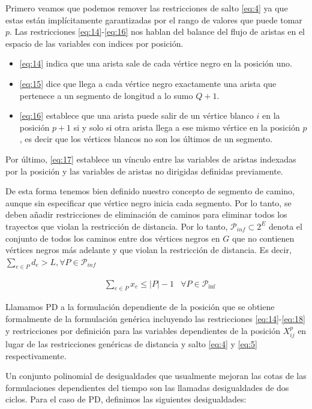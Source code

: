\documentclass[10pt, a4paper]{article}
\theoremstyle{definition}
\begin{document}
Primero veamos que podemos remover las restricciones de salto \ref{eq:4} ya que estas están implícitamente garantizadas por el rango de valores que puede tomar $p$.
Las restricciones \ref{eq:14}-\ref{eq:16} nos hablan del balance del flujo de aristas en el espacio de las variables con indices por posición.
\begin{itemize}
  \item \ref{eq:14} indica que una arista sale de cada vértice negro en la posición uno.
  \item \ref{eq:15} dice que llega a cada vértice negro exactamente una arista que pertenece a un segmento de longitud a lo sumo $Q+1$.
  \item \ref{eq:16} establece que una arista puede salir de un vértice blanco $i$ en la posición $p+1$ si y solo si otra arista llega a ese mismo vértice en la posición $p$, es decir que los vértices blancos no son los últimos de un segmento.
\end{itemize}
Por último, \ref{eq:17} establece un vínculo entre las variables de aristas indexadas por la posición y las variables de aristas no dirigidas definidas previamente.

De esta forma tenemos bien definido nuestro concepto de segmento de camino, aunque sin especificar que vértice negro inicia cada segmento. Por lo tanto, se deben añadir restricciones de eliminación de caminos para eliminar todos los trayectos que violan la restricción de distancia.
Por lo tanto, $\mathcal{P}_{inf} \subset 2^E$ denota el conjunto de todos los caminos entre dos vértices negros en $G$ que no contienen vértices negros más adelante y que violan la restricción de distancia.
Es decir, $\sum_{e \in P} d_e > L, \forall P \in \mathcal{P}_{inf}$


\begin{align}
	& \sum_{e \in P} x_{e} \leq|P|-1 & \forall P \in \mathcal{P}_{\mathrm{inf}} \label{eq:18}
\end{align}

Llamamos PD a la formulación dependiente de la posición que se obtiene formalmente de la formulación genérica incluyendo las restricciones \ref{eq:14}-\ref{eq:18} y restricciones por definición para las variables dependientes de la posición $X_{ij}^p$ en lugar de las restricciones genéricas de distancia y salto \ref{eq:4} y \ref{eq:5} respectivamente.

Un conjunto polinomial de desigualdades que usualmente mejoran las cotas de las formulaciones dependientes del tiempo son las llamadas desigualdades de dos ciclos. Para el caso de PD, definimos las siguientes desigualdades:
\end{document}

